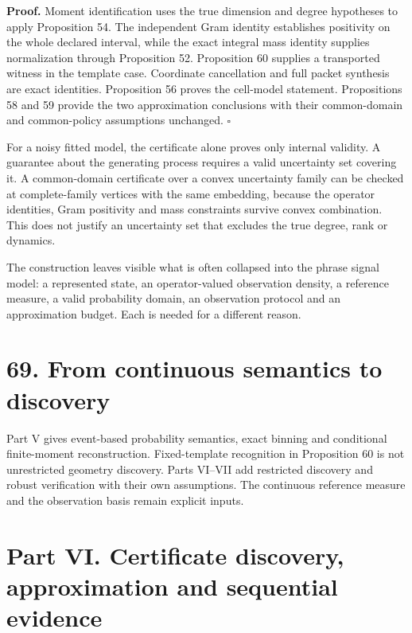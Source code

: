 \documentclass[11pt,letterpaper]{article}
\begin{document}
\textbf{Proof.} Moment identification uses the true dimension and degree
hypotheses to apply Proposition 54. The independent Gram identity
establishes positivity on the whole declared interval, while the exact
integral mass identity supplies normalization through Proposition 52.
Proposition 60 supplies a transported witness in the template case.
Coordinate cancellation and full packet synthesis are exact identities.
Proposition 56 proves the cell-model statement. Propositions 58 and 59
provide the two approximation conclusions with their common-domain and
common-policy assumptions unchanged. \(\square\)

For a noisy fitted model, the certificate alone proves only internal
validity. A guarantee about the generating process requires a valid
uncertainty set covering it. A common-domain certificate over a convex
uncertainty family can be checked at complete-family vertices with the
same embedding, because the operator identities, Gram positivity and
mass constraints survive convex combination. This does not justify an
uncertainty set that excludes the true degree, rank or dynamics.

The construction leaves visible what is often collapsed into the phrase
signal model: a represented state, an operator-valued observation
density, a reference measure, a valid probability domain, an observation
protocol and an approximation budget. Each is needed for a different
reason.

\section{69. From continuous semantics to
discovery}\label{from-continuous-semantics-to-discovery}

Part V gives event-based probability semantics, exact binning and
conditional finite-moment reconstruction. Fixed-template recognition in
Proposition 60 is not unrestricted geometry discovery. Parts VI--VII add
restricted discovery and robust verification with their own assumptions.
The continuous reference measure and the observation basis remain
explicit inputs.

\newpage

\section{Part VI. Certificate discovery, approximation and sequential
evidence}\label{part-vi.-certificate-discovery-approximation-and-sequential-evidence}
\end{document}
